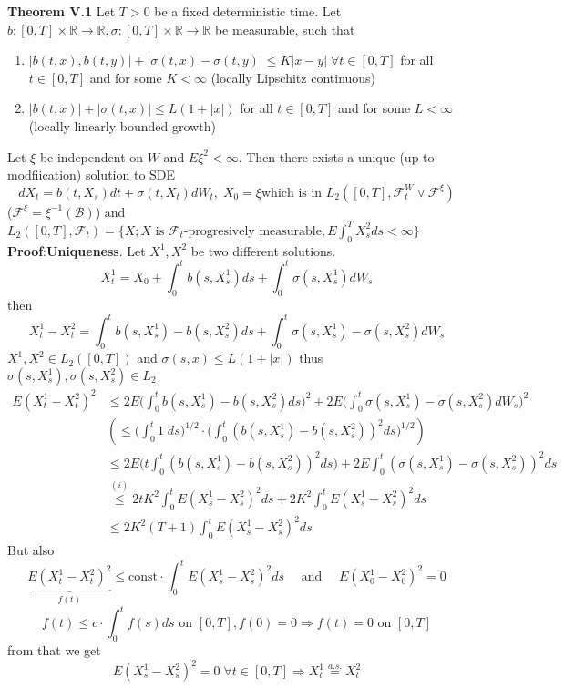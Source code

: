 \documentclass[english]{article}
\newcommand{\R}{\mathbb{R}}
\newcommand{\ub}{\underbrace}
\newcommand{\note}[1]{\noindent\textbf{#1}}
\newcommand{\F}{\mathcal F}
\newcommand{\as}[1]{\stackrel {a.s.}{#1}}
\begin{document}
\note{Theorem V.1} Let $T>0$ be a fixed deterministic time. Let $b:[0,T]\times \R \to \R, \sigma:[0,T]\times \R \to \R$ be measurable, such that \begin{enumerate}
\item $|b(t,x), b(t,y)| + |\sigma(t,x) - \sigma(t,y)| \leq K|x-y| \; \forall t \in [0,T]$ for all $t\in[0,T]$ and for some $K< \infty$ (locally Lipschitz continuous)
\item $|b(t,x)|+ |\sigma(t,x)| \leq L(1+|x|)$ for all $t\in [0,T]$ and for some $L<\infty$ (locally linearly bounded growth)
\end{enumerate}
Let $\xi$ be independent on $W$ and $E\xi^2 < \infty$. Then there exists a unique (up to modfiication) solution to SDE
$$dX_t = b(t, X_s) dt + \sigma(t, X_t) dW_t, \; X_0 = \xi \text{which is in }L_2([0,T], \F^W_t \vee \F^\xi)$$
($\F^\xi = \xi^{-1}(\mathcal B)$) and $L_2([0,T], \F_t) = \{ X; X \text{ is } \F_t\text{-progresively measurable}, E\int^T_0 X^2_s ds < \infty \}$ \newline
\note{Proof}:\textbf{Uniqueness}. Let $X^1, X^2$ be two different solutions.
$$X^1_t = X_0 + \int^t_0 b(s, X_s^1) ds + \int^t_0 \sigma(s, X^1_s) dW_s$$
then
$$X^1_t - X^2_t = \int^t_0 b(s,X^1_s) - b(s,X^2_s) ds + \int^t_0 \sigma(s, X_s^1) - \sigma(s, X^2_s) dW_s$$
$X^1, X^2 \in L_2 ([0,T])$ and $\sigma(s,x) \leq L(1+|x|)$ thus $\sigma(s, X^1_s), \sigma(s, X_s^2) \in L_2$
\begin{align*}
E(X_t^1 - X_t^2)^2 & \leq 2E\Big(\int^t_0 b(s, X^1_s) - b(s, X^2_s) ds \Big)^2 + 2E\Big(\int^t_0 \sigma(s, X^1_s) - \sigma(s, X^2_s) dW_s \Big)^2 \\
&(\leq \Big(\int^t_0 1 \; ds \Big)^{1/2} \cdot \Big(\int^t_0( b(s, X^1_s) - b(s, X^2_s) )^2ds \Big)^{1/2} )\\
& \leq 2E\Big(t \int^t_0 (b(s, X^1_s) - b(s, X^2_s))^2 ds \Big) + 2E \int^t_0 (\sigma(s, X^1_s) - \sigma(s, X^2_s))^2 ds \\
& \stackrel {(i)}\leq 2tK^2 \int^t_0 E(X^1_s - X^2_s)^2 ds + 2K^2 \int^t_0 E(X^1_s - X^2_s)^2 ds\\
& \leq 2K^2(T+1) \int^t_0 E(X_s^1 - X_s^2)^2 ds
\end{align*}
But also
$$\ub{E(X^1_t - X^2_t)^2}_{f(t)} \leq \text{const}\cdot \int^t_0 E(X^1_s - X^2_s)^2 ds \quad \text{ and }\quad E(X^1_0 - X^2_0)^2 = 0$$
$$f(t) \leq c\cdot \int^t_0 f(s) ds \text{ on }[0,T], f(0) = 0 \Rightarrow f(t) = 0 \text{ on }[0,T]$$
from that we get 
$$E(X^1_s - X^2_s)^2 = 0 \; \forall t \in [0,T] \Rightarrow X_t^1 \as = X_t^2$$
\end{document}
